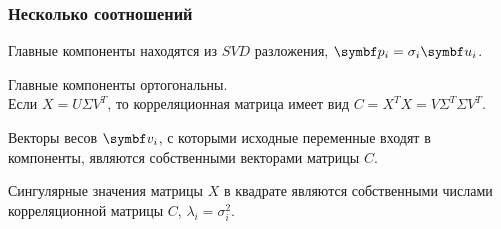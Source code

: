 \begin{frame}
  \frametitle{Несколько соотношений}

  Главные компоненты находятся из $SVD$ разложения, $\bp_i = \sigma_i \bu_i$. \pause

  Главные компоненты ортогональны. \\

  Если $X = U\Sigma V^T$, то корреляционная матрица имеет вид $C=X^TX = V\Sigma^T \Sigma V^T$. \pause

  Векторы весов $\bv_i$, с которыми исходные переменные входят в компоненты, являются
  собственными векторами матрицы $C$.

  Сингулярные значения матрицы $X$ в квадрате являются собственными числами 
  корреляционной матрицы $C$, $\lambda_i = \sigma_i^2$.


\end{frame}
